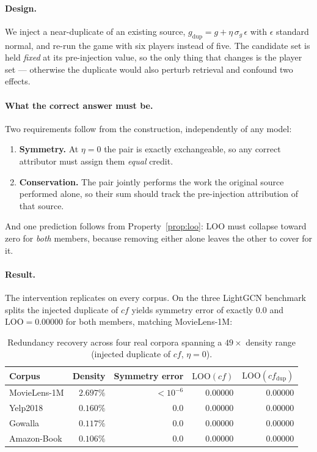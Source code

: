 \documentclass[11pt]{article}
\newcommand{\LOO}{\mathrm{LOO}}
\begin{document}
\paragraph{Design.} We inject a near-duplicate of an existing source,
$g_{\text{dup}} = g + \eta\,\sigma_g\,\epsilon$ with $\epsilon$ standard
normal, and re-run the game with six players instead of five. The candidate set
is held \emph{fixed} at its pre-injection value, so the only thing that changes
is the player set --- otherwise the duplicate would also perturb retrieval and
confound two effects.

\paragraph{What the correct answer must be.} Two requirements follow from the
construction, independently of any model:
\begin{enumerate}
\item \textbf{Symmetry.} At $\eta = 0$ the pair is exactly exchangeable, so any
      correct attributor must assign them \emph{equal} credit.
\item \textbf{Conservation.} The pair jointly performs the work the original
      source performed alone, so their sum should track the pre-injection
      attribution of that source.
\end{enumerate}
And one prediction follows from Property~\ref{prop:loo}: LOO must collapse
toward zero for \emph{both} members, because removing either alone leaves the
other to cover for it.

\paragraph{Result.} The intervention replicates on every corpus. On the three
LightGCN benchmark splits the injected duplicate of $cf$ yields symmetry error
of exactly $0.0$ and $\LOO = 0.00000$ for both members, matching MovieLens-1M:

\begin{table}[htbp]
\centering\footnotesize
\caption{Redundancy recovery across four real corpora spanning a $49\times$
density range (injected duplicate of $cf$, $\eta = 0$).}
\label{tab:recovery-multi}
\begin{tabular}{lrrrr}
\toprule
Corpus & Density & Symmetry error & $\LOO(cf)$ & $\LOO(cf_{\text{dup}})$ \\
\midrule
MovieLens-1M & $2.697\%$ & $<10^{-6}$ & $0.00000$ & $0.00000$ \\
Yelp2018     & $0.160\%$ & $0.0$      & $0.00000$ & $0.00000$ \\
Gowalla      & $0.117\%$ & $0.0$      & $0.00000$ & $0.00000$ \\
Amazon-Book  & $0.106\%$ & $0.0$      & $0.00000$ & $0.00000$ \\
\bottomrule
\end{tabular}
\end{table}
\end{document}

